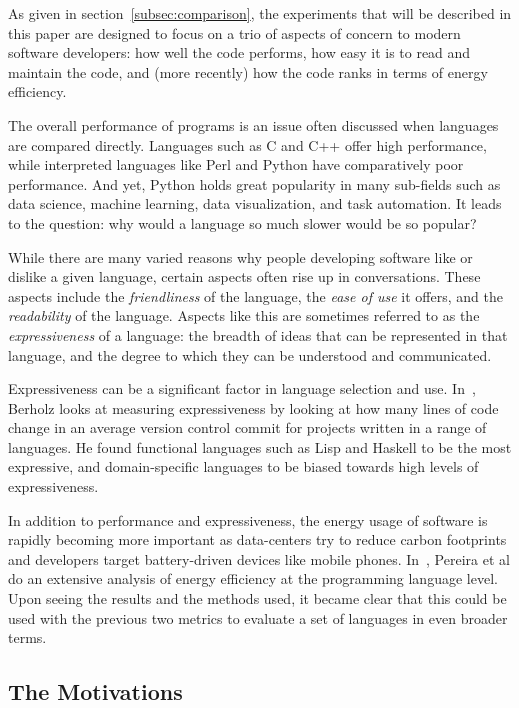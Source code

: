 As given in section~\ref{subsec:comparison}, the experiments that will be described in this paper are designed to focus on a trio of aspects of concern to modern software developers: how well the code performs, how easy it is to read and maintain the code, and (more recently) how the code ranks in terms of energy efficiency.

The overall performance of programs is an issue often discussed when languages are compared directly. Languages such as C and C++ offer high performance, while interpreted languages like Perl and Python have comparatively poor performance. And yet, Python holds great popularity in many sub-fields such as data science, machine learning, data visualization, and task automation. It leads to the question: why would a language so much slower would be so popular?

While there are many varied reasons why people developing software like or dislike a given language, certain aspects often rise up in conversations. These aspects include the \textit{friendliness} of the language, the \textit{ease of use} it offers, and the \textit{readability} of the language. Aspects like this are sometimes referred to as the \textit{expressiveness} of a language: the breadth of ideas that can be represented in that language, and the degree to which they can be understood and communicated.

Expressiveness can be a significant factor in language selection and use. In~\cite{berkholz}, Berholz looks at measuring expressiveness by looking at how many lines of code change in an average version control commit for projects written in a range of languages. He found functional languages such as Lisp and Haskell to be the most expressive, and domain-specific languages to be biased towards high levels of expressiveness.

In addition to performance and expressiveness, the energy usage of software is rapidly becoming more important as data-centers try to reduce carbon footprints and developers target battery-driven devices like mobile phones. In~\cite{pereira}, Pereira et al do an extensive analysis of energy efficiency at the programming language level. Upon seeing the results and the methods used, it became clear that this could be used with the previous two metrics to evaluate a set of languages in even broader terms.

\subsection{The Motivations}

